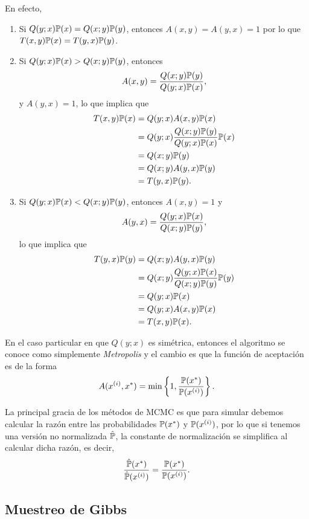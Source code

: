 En efecto,
\begin{enumerate}
	\item Si \(Q(y; x) \mathbb{P}(x) = Q(x; y) \mathbb{P}(y)\), entonces \(A(x, y) = A(y ,x) = 1\) por lo que \(T(x, y) \mathbb{P}(x) = T(y, x)\mathbb{P}(y)\).
	
	\item Si \(Q(y; x) \mathbb{P}(x) > Q(x; y) \mathbb{P}(y)\), entonces
	\[A(x, y) = \frac{Q(x; y) \mathbb{P}(y)}{Q(y; x) \mathbb{P}(x)},\]
	y \(A(y, x) = 1\), lo que implica que
	\begin{align*}
	T(x, y) \mathbb{P}(x)	&= Q(y; x) A(x, y) \mathbb{P}(x)\\
	&= Q(y; x) \frac{Q(x; y) \mathbb{P}(y)}{Q(y; x) \mathbb{P}(x)} \mathbb{P}(x)\\
	&= Q(x; y) \mathbb{P}(y)\\
	&= Q(x; y) A(y, x) \mathbb{P}(y)\\
	&= T(y, x)\mathbb{P}(y).
	\end{align*}
	\item Si \(Q(y; x) \mathbb{P}(x) < Q(x; y) \mathbb{P}(y)\), entonces \(A(x, y) = 1\) y
	\[A(y, x) = \frac{Q(y; x) \mathbb{P}(x)}{Q(x; y) \mathbb{P}(y)},\]
	lo que implica que
	\begin{align*}
	T(y, x) \mathbb{P}(y)	&= Q(x; y) A(y, x) \mathbb{P}(y)\\
	&= Q(x; y) \frac{Q(y; x) \mathbb{P}(x)}{Q(x; y) \mathbb{P}(y)} \mathbb{P}(y)\\
	&= Q(y; x) \mathbb{P}(x)\\
	&= Q(y; x) A(x, y) \mathbb{P}(x)\\
	&= T(x,y) \mathbb{P}(x).
	\end{align*}
\end{enumerate}

En el caso particular en que \(Q(y; x)\) es simétrica, entonces el algoritmo se conoce como simplemente \emph{Metropolis} y el cambio es que la función de aceptación es de la forma
\begin{equation*}
A(x^{(i)}, x^{\ast}) = \min \left\{1, \frac{\mathbb{P}(x^{\ast})}{\mathbb{P}(x^{(i)})}\right\}.
\end{equation*}

La principal gracia de los métodos de MCMC es que para simular debemos calcular la razón entre las probabilidades \(\mathbb{P}(x^{\ast})\) y \(\mathbb{P}(x^{(i)})\), por lo que si tenemos una versión no normalizada \(\hat{\mathbb{P}}\), la constante de normalización se simplifica al calcular dicha razón, es decir,
\[\frac{\hat{\mathbb{P}}(x^{\ast})}{\hat{\mathbb{P}}(x^{(i)})} = \frac{\mathbb{P}(x^{\ast})}{\mathbb{P}(x^{(i)})}.\]

\subsection{Muestreo de Gibbs}

